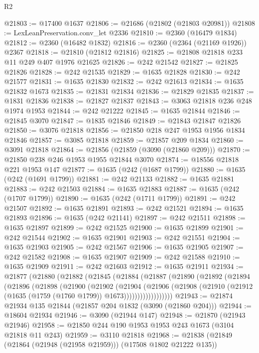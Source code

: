 \begin{lexlean}{R2}
\begin{coremodule}
@21803 := @17400 @1637
@21806 := @21686 (@21802 (@21803 @20981))
@21808 := LexLeanPreservation.conv_let @2336
@21810 := @2360 (@16479 @1834)
@21812 := @2360 (@16482 @1832)
@21816 := @2360 (@2364 (@21169 @1926)) @2367
@21818 := @21810 (@21812 @21816)
@21825 := @21808 @21818 @233 @11 @249 @407 @1976 @21625
@21826 := @242 @21542
@21827 := @21825 @21826
@21828 := @242 @21535
@21829 := @1635 @21828
@21830 := @242 @21577
@21831 := @1635 @21830
@21832 := @242 @21613
@21834 := @1635 @21832 @1673
@21835 := @21831 @21834
@21836 := @21829 @21835
@21837 := @1831 @21836
@21838 := @21827 @21837
@21843 := @3063 @21818 @236 @248 @1974 @1953
@21844 := @242 @21222
@21845 := @1635 @21844
@21846 := @21845 @3070
@21847 := @1835 @21846
@21849 := @21843 @21847 @21826
@21850 := @3076 @21818
@21856 := @21850 @218 @247 @1953 @1956 @1834 @21846
@21857 := @3085 @21818
@21859 := @21857 @209 @1834
@21860 := @3091 @21818
@21864 := @21856 (@21859 (@3090 (@21860 @209)))
@21870 := @21850 @238 @246 @1953 @1955 @21844 @3070
@21874 := @18556 @21818 @221 @1953 @147
@21877 := @1635 (@242 (@1687 @1799))
@21880 := @1635 (@242 (@1691 @1799))
@21881 := @242 @21133
@21882 := @1635 @21881
@21883 := @242 @21503
@21884 := @1635 @21883
@21887 := @1635 (@242 (@1707 @1799))
@21890 := @1635 (@242 (@1711 @1799))
@21891 := @242 @21507
@21892 := @1635 @21891
@21893 := @242 @21521
@21894 := @1635 @21893
@21896 := @1635 (@242 @21141)
@21897 := @242 @21511
@21898 := @1635 @21897
@21899 := @242 @21525
@21900 := @1635 @21899
@21901 := @242 @21544
@21902 := @1635 @21901
@21903 := @242 @21551
@21904 := @1635 @21903
@21905 := @242 @21567
@21906 := @1635 @21905
@21907 := @242 @21582
@21908 := @1635 @21907
@21909 := @242 @21588
@21910 := @1635 @21909
@21911 := @242 @21603
@21912 := @1635 @21911
@21934 := @21877
    (@21880
      (@21882
        (@21845
          (@21884
            (@21887
              (@21890
                (@21892
                  (@21894
                    (@21896
                      (@21898
                        (@21900
                          (@21902
                            (@21904
                              (@21906
                                (@21908
                                  (@21910
                                    (@21912 (@1635 (@1759 (@1760 @1799)) @1673))))))))))))))))))
@21943 := @21874 @21934 @135 @21844 (@21857 @204 @1832 (@3090 (@21860 @204)))
@21944 := @18604 @21934
@21946 := @3090 (@21944 @147)
@21948 := @21870 (@21943 @21946)
@21958 := @21850 @244 @190 @1953 @1953 @243 @1673 (@3104 @21818 @11 @243)
@21959 := @3110 @21818
@21968 := @21838 (@21849 (@21864 (@21948 (@21958 @21959))) (@17508 @1802 @21222 @135))

\end{coremodule}
\end{lexlean}
